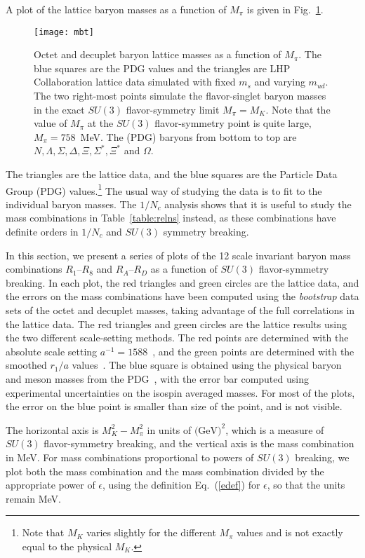 \documentclass[twocolumn,nofootinbib,prd,aps,superscriptaddress,tightenlines]{revtex4}
\def\ufont#1{\text{#1}}
\begin{document}
A plot of the lattice baryon masses as a function of $M_\pi$ is given in Fig.~\ref{fig:mbt}.
\begin{figure}
\texttt{[image: mbt]}
\caption{Octet and decuplet baryon lattice masses as a function of $M_\pi$. The blue squares are the PDG values and the triangles are LHP Collaboration lattice data simulated with fixed $m_s$ and varying $m_{ud}$.  The two right-most points simulate the flavor-singlet baryon masses in the exact $SU(3)$ flavor-symmetry limit $M_\pi = M_K$.  Note that the value of $M_\pi$ at the $SU(3)$ flavor-symmetry point is quite large, $M_\pi =758$~MeV. The (PDG) baryons from bottom to top are $N,\Lambda,\Sigma,\Delta,\Xi,\Sigma^*,\Xi^*$ and $\Omega$. \label{fig:mbt}}
\end{figure}
The triangles are the lattice data, and the blue squares are the Particle Data Group (PDG) values.\footnote{Note that $M_K$ varies slightly for the different $M_\pi$ values and is not exactly equal to the physical $M_K$.} 
The usual way of studying the data is to fit to 
the individual baryon masses. The $1/N_c$ analysis shows that it is useful to study the mass combinations in Table~\ref{table:relns} instead, as these combinations have definite orders in $1/N_c$ and $SU(3)$ symmetry breaking.

In this section, we present a series of plots of the 12 scale invariant baryon mass combinations $R_1$--$R_8$ and $R_A$--$R_D$ as a function of $SU(3)$ flavor-symmetry breaking.  In each plot, the red triangles and green circles are the lattice data, and the errors on the mass combinations have been computed using the \textit{bootstrap} data sets of the octet and decuplet masses, taking advantage of the full correlations in  the lattice data. The red triangles and green circles  are the lattice results using the two different scale-setting methods.  The red points are determined with the absolute scale setting $a^{-1}=1588$~\ufont{MeV}, and the green points are determined with the smoothed $r_1/a$ values~\cite{Aubin:2004wf}.  The blue square is obtained using the physical baryon and meson masses from the PDG~\cite{pdg}, with the error bar computed using experimental uncertainties on the isospin averaged masses. For most of the plots, the error on the blue point is smaller than size of the point, and is not visible.

The horizontal axis is $M_K^2-M_\pi^2$ in units of $\text{(GeV)}^2$, which is a measure of $SU(3)$ flavor-symmetry breaking, and the vertical axis is the mass combination in MeV. For mass combinations proportional to powers of $SU(3)$ breaking, we plot both the mass combination and the mass combination divided by the appropriate power of $\epsilon$, using the definition Eq.~(\ref{edef}) for $\epsilon$, so that the units remain MeV.
\end{document}
